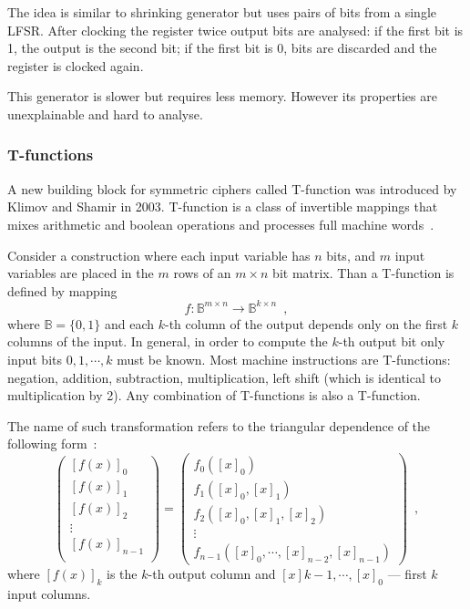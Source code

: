 The idea is similar to shrinking generator but uses pairs of bits from a single
LFSR. After clocking the register twice output bits are analysed: if the first
bit is 1, the output is the second bit; if the first bit is 0, bits are
discarded and the register is clocked again.

This generator is slower but requires less memory. However its properties are
unexplainable and hard to analyse.

\subsubsection{T-functions}

A new building block for symmetric ciphers called T-function was introduced by
Klimov and Shamir in 2003. T-function is a class of invertible mappings that
mixes arithmetic and boolean operations and processes full machine
words~\cite{klimov:tfunc}. 

Consider a construction where each input variable has $n$ bits, and $m$ input
variables are placed in the $m$ rows of an $m \times n$ bit matrix. Than a
T-function is defined by mapping
\begin{equation}
    \label{eqn:t-func}
    f: \mathbb{B}^{m \times n} \rightarrow \mathbb{B}^{k \times n} \enspace,
\end{equation}%
where $\mathbb{B} = \{0, 1\}$ and each $k$-th column of the output depends only on
the first $k$ columns of the input. In general, in order to compute the $k$-th
output bit only input bits $0, 1, \cdots, k$ must be known. Most machine
instructions are T-functions: negation, addition, subtraction, multiplication, left
shift (which is identical to multiplication by 2). Any combination of
T-functions is also a T-function.

The name of such transformation refers to the triangular dependence of the following
form~\cite{dblp:conf/fse/klimovs05}:
\begin{equation}
    \left(
    \begin{array}{c}
        \left[ f(x) \right]_0 \\
        \left[ f(x) \right]_1 \\
        \left[ f(x) \right]_2 \\
        \vdots \\
        \left[ f(x) \right]_{n-1} \\
    \end{array} \right)%
    = \left(
    \begin{array}{c}
        f_0([x]_0) \\
        f_1([x]_0, [x]_1) \\
        f_2([x]_0, [x]_1, [x]_2) \\
        \vdots \\
        f_{n-1}([x]_0, \cdots, [x]_{n-2}, [x]_{n-1})
    \end{array} \right) \enspace, 
\end{equation}
where $\left[ f(x) \right]_k$ is the $k$-th output column and 
$[x]k-1, \cdots, [x]_0$ --- first $k$ input columns.

